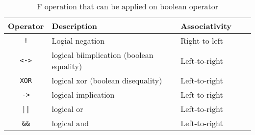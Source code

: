 \begin{table}[h]
\centering

\begin{tabular}{|c|l|l|l|l|}
\hline
\textbf{Operator} & \textbf{Description} & \textbf{Associativity} \\ 
\hline
\verb|!|	& Logial negation	& Right-to-left	\\
\verb|<->| & logical biimplication (boolean equality) & Left-to-right \\ \hline
\verb|XOR| & logical xor (boolean disequality) & Left-to-right \\ \hline
\verb|->|  & logical implication & Left-to-right \\ \hline
\verb!||!  & logical or & Left-to-right\\ \hline
\verb|&&|	& logical and & Left-to-right\\ \hline
\hline
\end{tabular}
\caption{F operation that can be applied on boolean operator}
\label{table:f:bool:operators}
\end{table}
